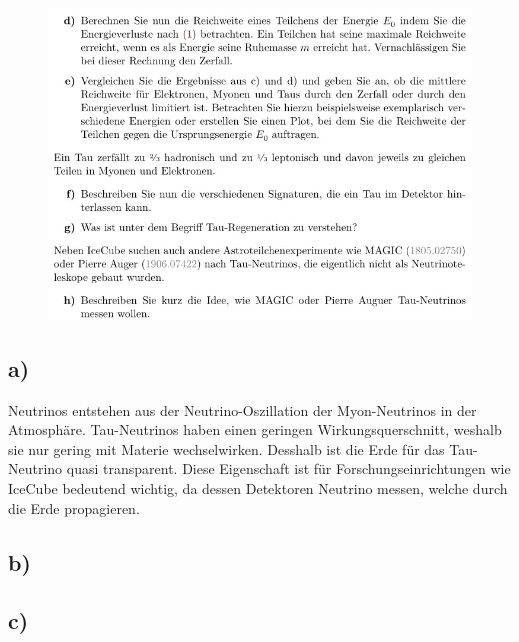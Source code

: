     \begin{figure}[H]
        \centering
        \includegraphics[width=\textwidth]{images/Aufgabe22b.jpg}
        \label{fig:2}
    \end{figure}

\subsection{a)}

    \justifying Neutrinos entstehen aus der Neutrino-Oszillation der Myon-Neutrinos in der Atmosphäre. Tau-Neutrinos haben einen geringen Wirkungsquerschnitt, 
    weshalb sie nur gering mit Materie wechselwirken. Desshalb ist die Erde für das Tau-Neutrino quasi transparent. Diese Eigenschaft ist für Forschungseinrichtungen wie 
    IceCube bedeutend wichtig, da dessen Detektoren Neutrino messen, welche durch die Erde propagieren. 

\subsection{b)}

\subsection{c)}

